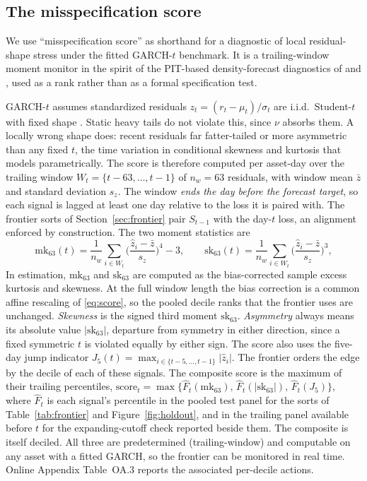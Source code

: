 \documentclass[11pt]{article}
\theoremstyle{remark}
\begin{document}
\subsection{The misspecification score}\label{sec:score}

We use ``misspecification score'' as shorthand for a diagnostic of local
residual-shape stress under the fitted GARCH-$t$ benchmark. It is a trailing-window moment monitor in the spirit of the PIT-based density-forecast diagnostics of \citet{dieboldgunthertay1998} and \citet{berkowitz2001}, used as a rank rather than as a formal specification test.

GARCH-$t$ assumes standardized residuals $z_t = (r_t - \mu_t)/\sigma_t$
are i.i.d.\ Student-$t$ with fixed shape \citep{bollerslev1987}. Static heavy tails do not violate this, since $\nu$ absorbs them. A locally wrong shape does: recent residuals far fatter-tailed or more asymmetric than any fixed $t$, the time variation in conditional skewness and kurtosis that \citet{hansen1994ARCD} models parametrically. The score is therefore computed per asset-day over the trailing window $W_t = \{t-63,\dots,t-1\}$ of $n_w = 63$ residuals, with window mean $\bar{z}$ and standard deviation $s_z$. The window \emph{ends the day before the forecast target}, so each signal is lagged at least one day relative to the loss it is paired with. The frontier sorts of Section~\ref{sec:frontier} pair $S_{t-1}$ with the day-$t$ loss, an alignment enforced by construction. The two moment statistics are
\begin{equation}
\mathrm{mk}_{63}(t) = \frac{1}{n_w}\sum_{i\in W_t}
\Big(\frac{\widehat{z}_i - \bar{z}}{s_z}\Big)^{4} - 3,
\qquad
\mathrm{sk}_{63}(t) = \frac{1}{n_w}\sum_{i\in W_t}
\Big(\frac{\widehat{z}_i - \bar{z}}{s_z}\Big)^{3},
\label{eq:score}
\end{equation}
In estimation, $\mathrm{mk}_{63}$ and $\mathrm{sk}_{63}$ are computed as
the bias-corrected sample excess kurtosis and skewness. At the full
window length the bias correction is a common affine rescaling of
\eqref{eq:score}, so the pooled decile ranks that the frontier uses are
unchanged.
\emph{Skewness} is the signed third moment $\mathrm{sk}_{63}$. \emph{Asymmetry} always means its absolute value $|\mathrm{sk}_{63}|$, departure from symmetry in either direction, since a fixed symmetric $t$ is violated equally by either sign. The score also uses the five-day jump indicator
$J_5(t) = \max_{i \in \{t-5,\dots,t-1\}} |\widehat{z}_i|$. The frontier
orders the edge by the decile of each of these signals. The composite score is the maximum of their trailing percentiles, $\mathrm{score}_t=\max\{\widehat{F}_t(\mathrm{mk}_{63}),\, \widehat{F}_t(|\mathrm{sk}_{63}|),\,\widehat{F}_t(J_5)\}$, where $\widehat{F}_t$ is each signal's percentile in the pooled test panel for the sorts of Table~\ref{tab:frontier} and Figure~\ref{fig:holdout}, and in the trailing panel available before $t$ for the expanding-cutoff check reported beside them. The composite is itself deciled.
All three are predetermined (trailing-window) and computable on any asset with a fitted GARCH, so the frontier can be monitored in real time. Online Appendix Table~OA.3 reports the associated
per-decile actions.
\end{document}

